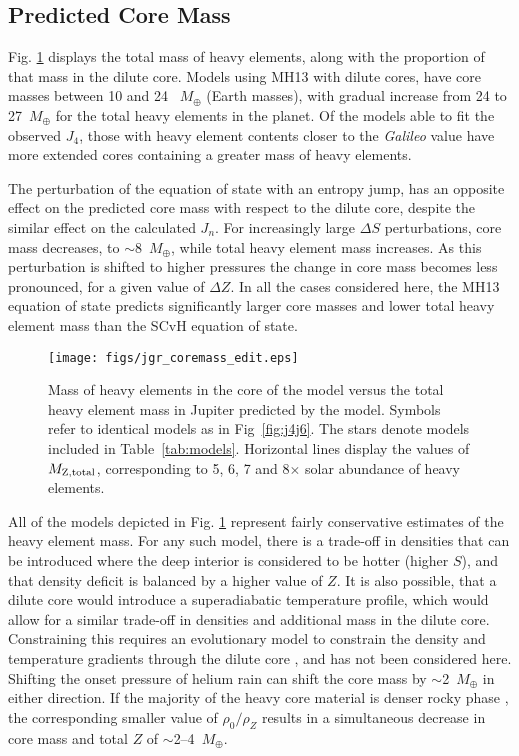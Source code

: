\subsection{Predicted Core Mass} \label{sec:core_mass}

Fig. \ref{fig:coremass} displays the total mass of heavy elements, along with
the proportion of that mass in the dilute core. Models using MH13 with dilute
cores, have core masses between 10 and 24 ~$M_\oplus$ (Earth masses), with
gradual increase from 24 to 27~$M_\oplus$ for the total heavy elements in the
planet. Of the models able to fit the observed $J_4$, those with heavy element
contents closer to the \textit{Galileo} value have more extended cores
containing a greater mass of heavy elements. 

The perturbation of the equation of state with an entropy jump, has an opposite
effect on the predicted core mass with respect to the dilute core, despite the similar
effect on the calculated $J_n$. For increasingly large $\Delta S$ perturbations, core
mass decreases, to $\sim$8~$M_\oplus$, while total heavy element mass increases.  As
this perturbation is shifted to higher pressures the change in core mass becomes less
pronounced, for a given value of $\Delta Z$. In all the cases considered here, the
MH13 equation of state predicts significantly larger core masses and lower
total heavy element mass than the SCvH equation of state.

\begin{figure}[h]
\centering

\texttt{[image: figs/jgr\_coremass\_edit.eps]}

\caption{Mass of heavy elements in the core of the model versus the total heavy
    element mass in Jupiter predicted by the model. Symbols refer to identical models
    as in Fig~\ref{fig:j4j6}. The stars denote models included in
    Table~\ref{tab:models}.  Horizontal lines display the values of $M_{\rm
    Z,total}$, corresponding to 5, 6, 7 and 8$\times$ solar abundance of heavy elements.
}
\label{fig:coremass}
\end{figure}


All of the models depicted in Fig. \ref{fig:coremass} represent fairly conservative
estimates of the heavy element mass. For any such model, there is a trade-off in
densities that can be introduced where the deep interior is considered to be hotter
(higher $S$), and that density deficit is balanced by a higher value of $Z$. 
It is also possible, that a dilute core would
introduce a superadiabatic temperature  profile, which would allow for a similar
trade-off in densities and additional mass in the dilute core.  Constraining this
requires an evolutionary model to constrain the density and temperature gradients
through the dilute core \citep{Leconte2012,Leconte2013}, and has not been
considered here.  Shifting the onset pressure of helium rain can shift the core mass
by $\sim$2~$M_\oplus$ in either direction. If the majority
of the heavy core material is denser rocky phase \citep{Soubiran2016}, the
corresponding smaller value of $\rho_0/\rho_Z$  results in a simultaneous decrease in
core mass and total $Z$ of $\sim$2--4~$M_\oplus$.

